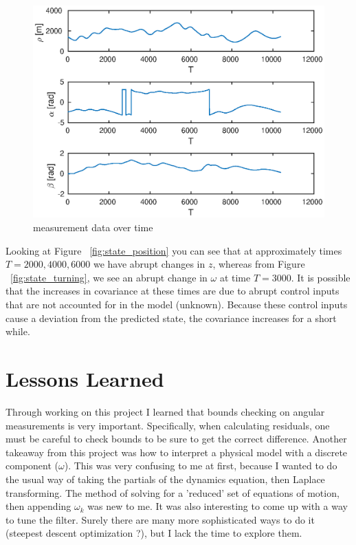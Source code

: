 \documentclass{article}
\begin{document}
\begin{figure}[!htbp]
	\centering
	\includegraphics[scale=0.7]{figs/measurements.eps}
	\caption{measurement data over time}
	\label{fig:measurements}
\end{figure}

Looking at Figure ~\ref{fig:state_position} you can see that at approximately times $T=2000, 4000, 6000$ we have abrupt changes in $z$, whereas from Figure ~\ref{fig:state_turning}, we see an abrupt change in $\omega$ at time $T=3000$. It is possible that the increases in covariance at these times are due to abrupt control inputs that are not accounted for in the model (unknown). Because these control inputs cause a deviation from the predicted state, the covariance increases for a short while. 

% 




\section{Lessons Learned}

Through working on this project I learned that bounds checking on angular measurements is very important. Specifically, when calculating residuals, one must be careful to check bounds to be sure to get the correct difference. Another takeaway from this project was how to interpret a physical model with a discrete component ($\omega$). This was very confusing to me at first, because I wanted to do the usual way of taking the partials of the dynamics equation, then Laplace transforming. The method of solving for a 'reduced' set of equations of motion, then appending $\omega_k$ was new to me. It was also interesting to come up with a way to tune the filter. Surely there are many more sophisticated ways to do it (steepest descent optimization ?), but I lack the time to explore them. 
\end{document}

